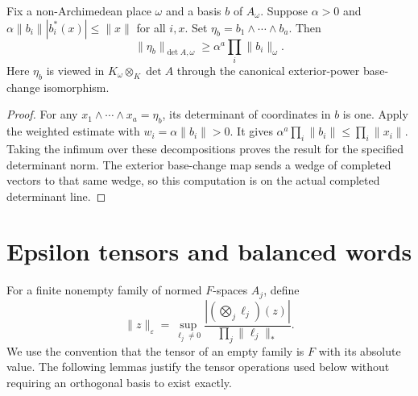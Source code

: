 \begin{lemma}
\label{lem:contraction-completed-determinant}
\leanok
Fix a non-Archimedean place $\omega$ and a basis $b$ of $A_\omega$.
Suppose $\alpha>0$ and $\alpha\|b_i\||b_i^*(x)|\leq\|x\|$ for all
$i,x$. Set $\eta_b=b_1\wedge\cdots\wedge b_a$. Then
\[
 \|\eta_b\|_{\det A,\omega}\geq
                  \alpha^a\prod_i\|b_i\|_\omega.
\]
Here $\eta_b$ is viewed in $K_\omega\otimes_K\det A$ through the canonical
exterior-power base-change isomorphism.
\end{lemma}
\begin{proof}
For any $x_1\wedge\cdots\wedge x_a=\eta_b$, its determinant of
coordinates in $b$ is one. Apply the weighted estimate with
$w_i=\alpha\|b_i\|>0$. It gives
$\alpha^a\prod_i\|b_i\|\leq\prod_i\|x_i\|$.
Taking the infimum over these decompositions proves the result for the
specified determinant norm. The exterior base-change map sends a wedge of
completed vectors to that same wedge, so this computation is on the actual
completed determinant line.
\end{proof}

\section{Epsilon tensors and balanced words}

For a finite nonempty family of normed $F$-spaces $A_j$, define
\[
 \|z\|_\varepsilon=
 \sup_{\ell_j\neq0}
 \frac{|(\bigotimes_j\ell_j)(z)|}{\prod_j\|\ell_j\|_*}.
\]
We use the convention that the tensor of an empty family is $F$ with its
absolute value. The following lemmas justify the tensor operations used below
without requiring an orthogonal basis to exist exactly.

